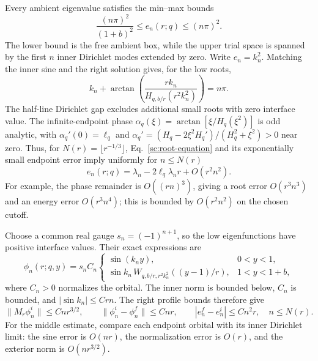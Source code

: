 \documentclass[aps,prl,reprint,superscriptaddress,longbibliography]{revtex4-2}
\begin{document}
Every ambient eigenvalue satisfies the min--max bounds
\begin{equation}
 \frac{(n\pi)^2}{(1+b)^2}\le e_n(r;q)\le(n\pi)^2.
 \label{sc:minmax}
\end{equation}
The lower bound is the free ambient box, while the upper trial space is
spanned by the first $n$ inner Dirichlet modes extended by zero. Write
$e_n=k_n^2$. Matching the inner sine and the right solution gives, for
the low roots,
\begin{equation}
 k_n+\arctan\!\left(\frac{rk_n}{H_{q,b/r}(r^2k_n^2)}\right)=n\pi.
 \label{sc:root-equation}
\end{equation}
The half-line Dirichlet gap excludes additional small roots with zero
interface value. The infinite-endpoint phase
$\alpha_q(\xi)=\arctan[\xi/H_q(\xi^2)]$ is odd analytic, with
$\alpha_q'(0)=\ell_q$ and
$\alpha_q'=(H_q-2\xi^2H_q')/(H_q^2+\xi^2)>0$ near zero. Thus, for
$N(r)=\lfloor r^{-1/3}\rfloor$, Eq.~\eqref{sc:root-equation} and its
exponentially small endpoint error imply uniformly for $n\le N(r)$
\begin{equation}
 e_n(r;q)=\lambda_n-2\ell_q\lambda_n r+O(r^2n^2).
 \label{sc:eigenvalues}
\end{equation}
For example, the phase remainder is $O((rn)^3)$, giving a root error
$O(r^3n^3)$ and an energy error $O(r^3n^4)$; this is bounded by
$O(r^2n^2)$ on the chosen cutoff.

Choose a common real gauge $s_n=(-1)^{n+1}$, so the low eigenfunctions
have positive interface values. Their exact expressions are
\begin{equation}
 \phi_n(r;q,y)=s_n C_n
 \begin{cases}
 \sin(k_ny),&0<y<1,\\
 \sin k_n\,W_{q,b/r,r^2k_n^2}((y-1)/r),&1<y<1+b,
 \end{cases}
 \label{sc:orbitals}
\end{equation}
where $C_n>0$ normalizes the orbital. The inner norm is bounded below,
$C_n$ is bounded, and $|\sin k_n|\le Crn$. The right profile bounds
therefore give
\begin{equation}
 \|M_r\phi_n^i\|\le Cnr^{3/2},\qquad
 \|\phi_n^i-\phi_n^f\|\le Cnr,\qquad
 |e_n^f-e_n^i|\le Cn^2r,
 \quad n\le N(r).
 \label{sc:static-bounds}
\end{equation}
For the middle estimate, compare each endpoint orbital with its inner
Dirichlet limit: the sine error is $O(nr)$, the normalization error is
$O(r)$, and the exterior norm is $O(nr^{3/2})$.
\end{document}
